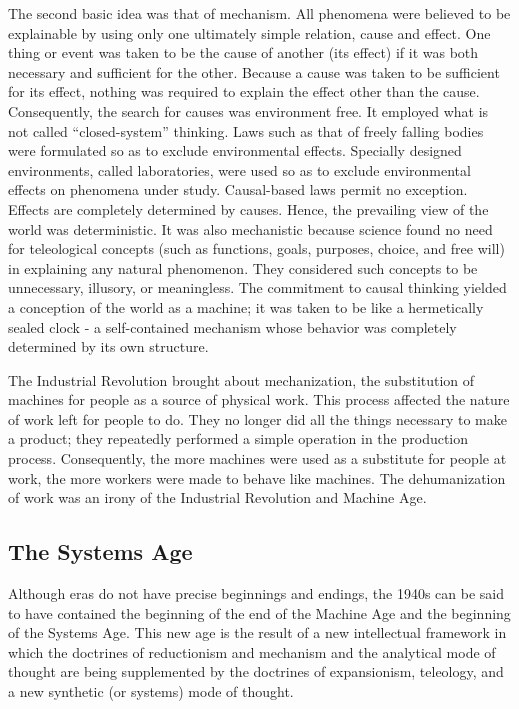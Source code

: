 The second basic idea was that of mechanism. All phenomena were believed to be explainable by using only one ultimately simple relation, cause and effect. One thing or event was taken to be the cause of another (its effect) if it was both necessary and sufficient for the other. Because a cause was taken to be sufficient for its effect, nothing was required to explain the effect other than the cause. Consequently, the search for causes was environment free. It employed what is not called ``closed-system'' thinking. Laws such as that of freely falling bodies were formulated so as to exclude environmental effects. Specially designed environments, called laboratories, were used so as to exclude environmental effects on phenomena under study. Causal-based laws permit no exception. Effects are completely determined by causes. Hence, the prevailing view of the world was deterministic. It was also mechanistic because science found no need for teleological concepts (such as functions, goals, purposes, choice, and free will) in explaining any natural phenomenon. They considered such concepts to be unnecessary, illusory, or meaningless. The commitment to causal thinking yielded a conception of the world as a machine; it was taken to be like a hermetically sealed clock - a self-contained mechanism whose behavior was completely determined by its own structure.

The Industrial Revolution brought about mechanization, the substitution of machines for people as a source of physical work. This process affected the nature of work left for people to do. They no longer did all the things necessary to make a product; they repeatedly performed a simple operation in the production process. Consequently, the more machines were used as a substitute for people at work, the more workers were made to behave like machines. The dehumanization of work was an irony of the Industrial Revolution and Machine Age.

\subsection{The Systems Age}

Although eras do not have precise beginnings and endings, the 1940s can be said to have contained the beginning of the end of the Machine Age and the beginning of the Systems Age. This new age is the result of a new intellectual framework in which the doctrines of reductionism and mechanism and the analytical mode of thought are being supplemented by the doctrines of expansionism, teleology, and a new synthetic (or systems) mode of thought.

